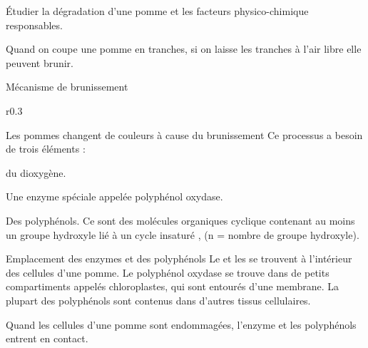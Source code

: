 \teteTermStssAlim
{}

\begin{objectifs}
  \item Étudier la dégradation d'une pomme et les facteurs physico-chimique responsables.
\end{objectifs}

\begin{contexte}
  Quand on coupe une pomme en tranches, si on laisse les tranches à l'air libre elle peuvent brunir.
  
\end{contexte}


\begin{doc}{Mécanisme de brunissement}
  \begin{wrapfigure}{r}{0.3\linewidth}
    \centering
    \vspace*{-15pt}
    \hspace{30pt}
    
  \end{wrapfigure}
  Les pommes changent de couleurs à cause du brunissement 
  Ce processus a besoin de trois éléments :
  \begin{listePoints}
    \item du dioxygène.
    \item Une enzyme spéciale appelée polyphénol oxydase.
    \item Des polyphénols. 
    Ce sont des molécules organiques cyclique contenant au moins un groupe hydroxyle  lié à un cycle insaturé , (n = nombre de groupe hydroxyle).
  \end{listePoints}
\end{doc}

\begin{doc}{Emplacement des enzymes et des polyphénols}
  Le  et les  se trouvent à l’intérieur des cellules d’une pomme.
  Le polyphénol oxydase se trouve dans de petits compartiments appelés chloroplastes, qui sont entourés d’une membrane.
  La plupart des polyphénols sont contenus dans d’autres tissus cellulaires.

  Quand les cellules d'une pomme sont endommagées, l'enzyme et les polyphénols entrent en contact.
\end{doc}

